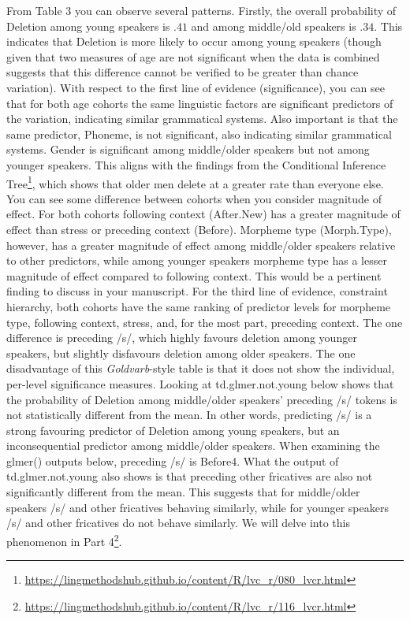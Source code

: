 \documentclass[
  10pt,
  letterpaper]{article}
\renewcommand\texttt[1]{{\ttfamily\color{BrickRed}#1}}
\DeclareRobustCommand{\href}[2]{#2\footnote{\url{#1}}}
\begin{document}
From Table 3 you can observe several patterns. Firstly, the overall
probability of \texttt{Deletion} among young speakers is \(.41\) and
among middle/old speakers is \(.34\). This indicates that
\texttt{Deletion} is more likely to occur among young speakers (though
given that two measures of age are not significant when the data is
combined suggests that this difference cannot be verified to be greater
than chance variation). With respect to the first line of evidence
(significance), you can see that for both age cohorts the same
linguistic factors are significant predictors of the variation,
indicating similar grammatical systems. Also important is that the same
predictor, \texttt{Phoneme}, is not significant, also indicating similar
grammatical systems. \texttt{Gender} is significant among middle/older
speakers but not among younger speakers. This aligns with the findings
from the
\href{https://lingmethodshub.github.io/content/R/lvc_r/080_lvcr.html}{Conditional
Inference Tree}, which shows that older men delete at a greater rate
than everyone else. You can see some difference between cohorts when you
consider magnitude of effect. For both cohorts following context
(\texttt{After.New}) has a greater magnitude of effect than stress or
preceding context (\texttt{Before}). Morpheme type
(\texttt{Morph.Type}), however, has a greater magnitude of effect among
middle/older speakers relative to other predictors, while among younger
speakers morpheme type has a lesser magnitude of effect compared to
following context. This would be a pertinent finding to discuss in your
manuscript. For the third line of evidence, constraint hierarchy, both
cohorts have the same ranking of predictor levels for morpheme type,
following context, stress, and, for the most part, preceding context.
The one difference is preceding /s/, which highly favours deletion among
younger speakers, but slightly disfavours deletion among older speakers.
The one disadvantage of this \emph{Goldvarb}-style table is that it does
not show the individual, per-level significance measures. Looking at
\texttt{td.glmer.not.young} below shows that the probability of
\texttt{Deletion} among middle/older speakers' preceding /s/ tokens is
not statistically different from the mean. In other words, predicting
/s/ is a strong favouring predictor of \texttt{Deletion} among young
speakers, but an inconsequential predictor among middle/older speakers.
When examining the \texttt{glmer()} outputs below, preceding /s/ is
\texttt{Before4}. What the output of \texttt{td.glmer.not.young} also
shows is that preceding other fricatives are also not significantly
different from the mean. This suggests that for middle/older speakers
/s/ and other fricatives behaving similarly, while for younger speakers
/s/ and other fricatives do not behave similarly. We will delve into
this phenomenon in
\href{https://lingmethodshub.github.io/content/R/lvc_r/116_lvcr.html}{Part
4}.
\end{document}
